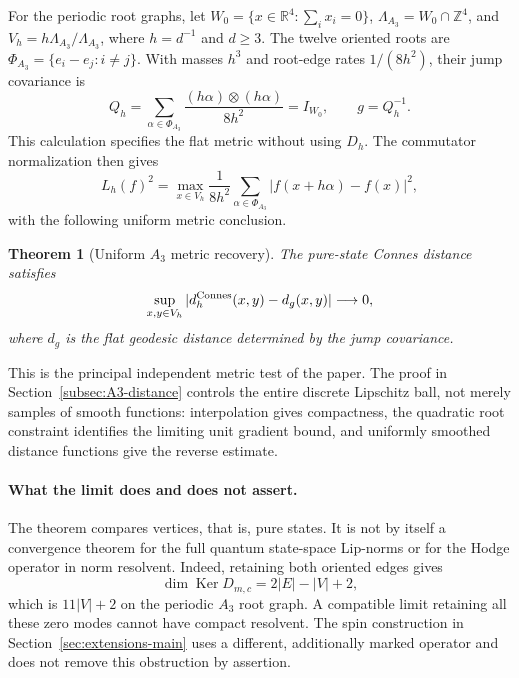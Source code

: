 \documentclass[11pt]{article}
\newtheorem{theorem}{Theorem}[section]
\theoremstyle{definition}
\theoremstyle{remark}
\theoremstyle{definition}
\theoremstyle{remark}
\newcommand{\Z}{\mathbb Z}
\newcommand{\R}{\mathbb R}
\newcommand{\Ker}{\operatorname{Ker}}
\begin{document}
For the periodic root graphs, let
$W_0=\{x\in\R^4:\sum_i x_i=0\}$,
$\Lambda_{A_3}=W_0\cap\Z^4$, and
$V_h=h\Lambda_{A_3}/\Lambda_{A_3}$, where $h=d^{-1}$ and $d\ge3$.
The twelve oriented roots are $\Phi_{A_3}=\{e_i-e_j:i\ne j\}$.
With masses $h^3$ and root-edge rates $1/(8h^2)$, their jump covariance is
\begin{equation}
 Q_h=\sum_{\alpha\in\Phi_{A_3}}
       \frac{(h\alpha)\otimes(h\alpha)}{8h^2}
     =I_{W_0},\qquad g=Q_h^{-1}.
 \label{eq:overview-A3-covariance}
\end{equation}
This calculation specifies the flat metric without using $D_h$.
The commutator normalization then gives
\begin{equation}
L_h(f)^2
=\max_{x\in V_h}\frac1{8h^2}
\sum_{\alpha\in\Phi_{A_3}}|f(x+h\alpha)-f(x)|^2,
\label{eq:summary-A3-Lip}
\end{equation}
with the following uniform metric conclusion.

\begin{theorem}[Uniform $A_3$ metric recovery]
\label{thm:summary-metric}
The pure-state Connes distance satisfies
\begin{equation}
\sup_{x,y\in V_h}
|d_h^{\rm Connes}(x,y)-d_g(x,y)|\longrightarrow0,
\label{eq:summary-A3-distance}
\end{equation}
where $d_g$ is the flat geodesic distance determined by the jump covariance.
\end{theorem}

This is the principal independent metric test of the paper.  The proof in
Section~\ref{subsec:A3-distance} controls the entire discrete Lipschitz ball,
not merely samples of smooth functions: interpolation gives compactness, the
quadratic root constraint identifies the limiting unit gradient bound, and
uniformly smoothed distance functions give the reverse estimate.

\paragraph{What the limit does and does not assert.}
The theorem compares vertices, that is, pure states.  It is not by itself a
convergence theorem for the full quantum state-space Lip-norms or for the
Hodge operator in norm resolvent.  Indeed, retaining both oriented edges gives
\begin{equation}
 \dim\Ker D_{m,c}=2|E|-|V|+2,
 \label{eq:overview-hodge-kernel}
\end{equation}
which is $11|V|+2$ on the periodic $A_3$ root graph.  A compatible limit retaining
all these zero modes cannot have compact resolvent.  The spin construction in
Section~\ref{sec:extensions-main} uses a different, additionally marked operator
and does not remove this obstruction by assertion.
\end{document}
